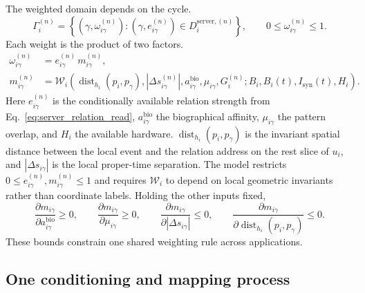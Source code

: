 The weighted domain depends on the cycle.
\begin{equation}
  \Gamma_i^{(n)}=
  \left\{\left(\gamma,\omega_{i\gamma}^{(n)}\right):
  (\gamma,e_{i\gamma}^{(n)})\in D_i^{\mathrm{server},(n)}\right\},
  \qquad 0\leq\omega_{i\gamma}^{(n)}\leq1.
  \label{eq:weighted_relational_domain}
\end{equation}
Each weight is the product of two factors.
\begin{align}
  \omega_{i\gamma}^{(n)}
    &=e_{i\gamma}^{(n)}\,m_{i\gamma}^{(n)},
    \label{eq:relation_weight}\\
  m_{i\gamma}^{(n)}
    &=\mathcal W_i\!\left(
      \operatorname{dist}_{h_i}(p_i,p_\gamma),|\Delta s_{i\gamma}^{(n)}|,
      a_{i\gamma}^{\mathrm{bio}},
      \mu_{i\gamma},G_i^{(n)};
      B_i,B_i(t),I_{\mathrm{syn}}(t),H_i
    \right).
    \label{eq:relation_mappability}
\end{align}
\noindent Here $e_{i\gamma}^{(n)}$ is the conditionally available relation strength
from Eq.~\eqref{eq:server_relation_read}, $a_{i\gamma}^{\mathrm{bio}}$ the
biographical affinity, $\mu_{i\gamma}$ the pattern overlap, and $H_i$ the available
hardware. $\operatorname{dist}_{h_i}(p_i,p_\gamma)$ is the invariant spatial distance
between the local event and the relation address on the rest slice of $u_i$, and
$|\Delta s_{i\gamma}|$ is the local proper-time separation. The model
restricts $0\leq e_{i\gamma}^{(n)},m_{i\gamma}^{(n)}\leq1$ and requires $\mathcal W_i$
to depend on local geometric invariants rather than coordinate labels. Holding the
other inputs fixed,
\begin{equation}
  \frac{\partial m_{i\gamma}}{\partial a_{i\gamma}^{\mathrm{bio}}}\geq0,
  \qquad
  \frac{\partial m_{i\gamma}}{\partial \mu_{i\gamma}}\geq0,
  \qquad
  \frac{\partial m_{i\gamma}}{\partial |\Delta s_{i\gamma}|}\leq0,
  \qquad
  \frac{\partial m_{i\gamma}}
              {\partial\operatorname{dist}_{h_i}(p_i,p_\gamma)}\leq0.
  \label{eq:mappability_constraints}
\end{equation}
These bounds constrain one shared weighting rule across applications.

\subsection{One conditioning and mapping process}

